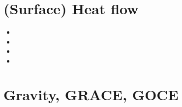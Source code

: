 \section{(Surface) Heat flow}
\begin{small}
\begin{itemize}
\item[\nineteensixtyseven] 
\item[\nineteenninetynine] 
\item[\twothousandten] 
\item[\twothousandtwenty]
\end{itemize}
\end{small}

\section{Gravity, GRACE, GOCE}

